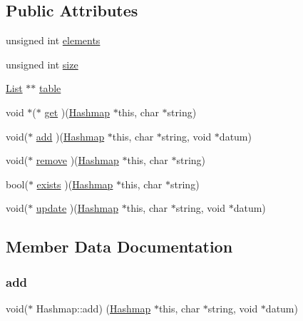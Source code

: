 \subsection*{Public Attributes}
\begin{DoxyCompactItemize}
\item 
unsigned int \hyperlink{structHashmap_acf25511ea4f01ef33fa00e3b40fddfb8}{elements}
\item 
unsigned int \hyperlink{structHashmap_acb5951c2662ce58e2196fcb465551e36}{size}
\item 
\hyperlink{structList}{List} $\ast$$\ast$ \hyperlink{structHashmap_a84d20ef62c1f397de5fdac234445c1e7}{table}
\item 
void $\ast$($\ast$ \hyperlink{structHashmap_a94750a8d94eb1d30ad153ccc447c40ae}{get} )(\hyperlink{structHashmap}{Hashmap} $\ast$this, char $\ast$string)
\item 
void($\ast$ \hyperlink{structHashmap_a86fd2c2aaa8f266c2e99a035479b67df}{add} )(\hyperlink{structHashmap}{Hashmap} $\ast$this, char $\ast$string, void $\ast$datum)
\item 
void($\ast$ \hyperlink{structHashmap_a869ddf80d753042c35a4741a0bd5b10b}{remove} )(\hyperlink{structHashmap}{Hashmap} $\ast$this, char $\ast$string)
\item 
bool($\ast$ \hyperlink{structHashmap_abcabe76ebc3b3f7744bc78b3d31682dc}{exists} )(\hyperlink{structHashmap}{Hashmap} $\ast$this, char $\ast$string)
\item 
void($\ast$ \hyperlink{structHashmap_ac7249166e6305fcec9a7fd4be614c3cd}{update} )(\hyperlink{structHashmap}{Hashmap} $\ast$this, char $\ast$string, void $\ast$datum)
\end{DoxyCompactItemize}


\subsection{Member Data Documentation}
\mbox{\label{structHashmap_a86fd2c2aaa8f266c2e99a035479b67df}} 
\subsubsection{\texorpdfstring{add}{add}}
{\footnotesize\ttfamily void($\ast$  Hashmap\+::add) (\hyperlink{structHashmap}{Hashmap} $\ast$this, char $\ast$string, void $\ast$datum)}

\mbox{\label{structHashmap_acf25511ea4f01ef33fa00e3b40fddfb8}} 
